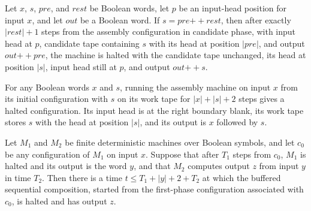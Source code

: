 \begin{lemma}
\label{Complexity.enumCont_concat_candidate}
\leanok
{}
Let $x$, $s$, $\mathit{pre}$, and $\mathit{rest}$ be Boolean words, let $p$ be an
input-head position for input $x$, and let $\mathit{out}$ be a Boolean word. If
$s=\mathit{pre}\mathbin{+\!\!+}\mathit{rest}$, then after exactly $|\mathit{rest}|+1$
steps from the assembly configuration in candidate phase, with input head at $p$,
candidate tape containing $s$ with its head at position $|\mathit{pre}|$, and output
$\mathit{out}\mathbin{+\!\!+}\mathit{pre}$, the machine is halted with the candidate tape
unchanged, its head at position $|s|$, input head still at $p$, and output
$\mathit{out}\mathbin{+\!\!+}s$.
\end{lemma}

\begin{lemma}
\label{Complexity.enumCont_concat_run}
\leanok
{}
For any Boolean words $x$ and $s$, running the assembly machine on input $x$ from its
initial configuration with $s$ on its work tape for $|x|+|s|+2$ steps gives a halted
configuration. Its input head is at the right boundary blank, its work tape stores $s$
with the head at position $|s|$, and its output is $x$ followed by $s$.
\end{lemma}

\begin{lemma}
\label{Complexity.enumCont_prepared_comp}
\leanok
{}
Let $M_1$ and $M_2$ be finite deterministic machines over Boolean symbols, and let $c_0$
be any configuration of $M_1$ on input $x$. Suppose that after $T_1$ steps from $c_0$,
$M_1$ is halted and its output is the word $y$, and that $M_2$ computes output $z$ from
input $y$ in time $T_2$. Then there is a time $t\le T_1+|y|+2+T_2$ at which the buffered
sequential composition, started from the first-phase configuration associated with
$c_0$, is halted and has output $z$.
\end{lemma}

